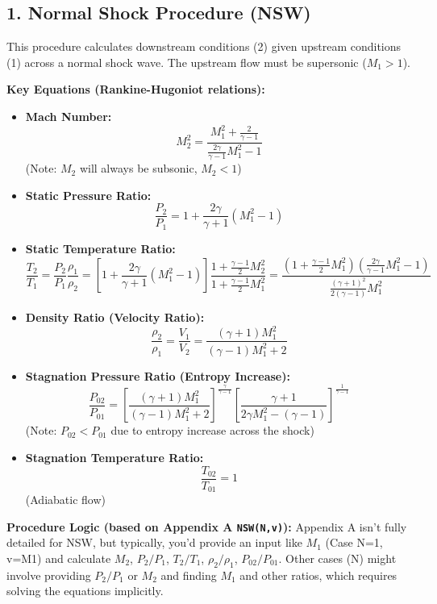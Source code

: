 \hypertarget{normal-shock-procedure-nsw}{%
\subsection{1. Normal Shock Procedure
(NSW)}\label{normal-shock-procedure-nsw}}

This procedure calculates downstream conditions (2) given upstream
conditions (1) across a normal shock wave. The upstream flow must be
supersonic (\(M_1 > 1\)).

\textbf{Key Equations (Rankine-Hugoniot relations):}

\begin{itemize}
\item
  \textbf{Mach Number:}
  \[ M_2^2 = \frac{M_1^2 + \frac{2}{\gamma - 1}}{\frac{2\gamma}{\gamma - 1}M_1^2 - 1} \]
  (Note: \(M_2\) will always be subsonic, \(M_2 < 1\))
\item
  \textbf{Static Pressure Ratio:}
  \[ \frac{P_2}{P_1} = 1 + \frac{2\gamma}{\gamma + 1}(M_1^2 - 1) \]
\item
  \textbf{Static Temperature Ratio:}
  \[ \frac{T_2}{T_1} = \frac{P_2}{P_1} \frac{\rho_1}{\rho_2} = \left[ 1 + \frac{2\gamma}{\gamma + 1}(M_1^2 - 1) \right] \frac{1 + \frac{\gamma - 1}{2}M_2^2}{1 + \frac{\gamma - 1}{2}M_1^2} = \frac{\left(1 + \frac{\gamma-1}{2}M_1^2\right) \left(\frac{2\gamma}{\gamma-1}M_1^2 - 1\right)}{\frac{(\gamma+1)^2}{2(\gamma-1)} M_1^2} \]
\item
  \textbf{Density Ratio (Velocity Ratio):}
  \[ \frac{\rho_2}{\rho_1} = \frac{V_1}{V_2} = \frac{(\gamma + 1)M_1^2}{(\gamma - 1)M_1^2 + 2} \]
\item
  \textbf{Stagnation Pressure Ratio (Entropy Increase):}
  \[ \frac{P_{02}}{P_{01}} = \left[ \frac{(\gamma + 1)M_1^2}{(\gamma - 1)M_1^2 + 2} \right]^{\frac{\gamma}{\gamma - 1}} \left[ \frac{\gamma + 1}{2\gamma M_1^2 - (\gamma - 1)} \right]^{\frac{1}{\gamma - 1}} \]
  (Note: \(P_{02} < P_{01}\) due to entropy increase across the shock)
\item
  \textbf{Stagnation Temperature Ratio:} \[ \frac{T_{02}}{T_{01}} = 1 \]
  (Adiabatic flow)
\end{itemize}

\textbf{Procedure Logic (based on Appendix A \texttt{NSW(N,v)}):}
Appendix A isn't fully detailed for NSW, but typically, you'd provide an
input like \(M_1\) (Case N=1, v=M1) and calculate \(M_2\), \(P_2/P_1\),
\(T_2/T_1\), \(\rho_2/\rho_1\), \(P_{02}/P_{01}\). Other cases (N) might
involve providing \(P_2/P_1\) or \(M_2\) and finding \(M_1\) and other
ratios, which requires solving the equations implicitly.

